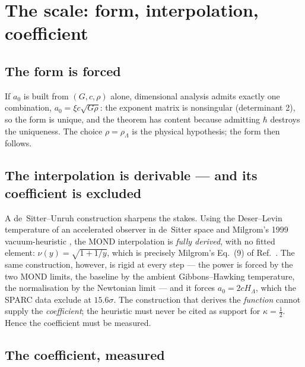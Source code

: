\documentclass[aps,prd,twocolumn,10pt,nofootinbib,superscriptaddress]{revtex4-2}
\begin{document}
\section{The scale: form, interpolation, coefficient}
\label{sec:coefficient}

\subsection{The form is forced}

If $a_0$ is built from $(G,c,\rho)$ alone, dimensional analysis admits exactly one combination,
$a_0=\xi c\sqrt{G\rho}$: the exponent matrix is nonsingular (determinant 2), so the form is unique,
and the theorem has content because admitting $\hbar$ destroys the uniqueness. The choice
$\rho=\rho_\Lambda$ is the physical hypothesis; the form then follows.

\subsection{The interpolation is derivable --- and its coefficient is excluded}

A de~Sitter--Unruh construction sharpens the stakes. Using the Deser--Levin temperature of an
accelerated observer in de~Sitter space \cite{DeserLevin} and Milgrom's 1999 vacuum-heuristic
\cite{Milgrom1999}, the MOND interpolation is \emph{fully derived}, with no fitted element:
$\nu(y)=\sqrt{1+1/y}$, which is precisely Milgrom's Eq.~(9) of Ref.~\cite{Milgrom1999}. The same
construction, however, is rigid at every step --- the power is forced by the two MOND limits, the
baseline by the ambient Gibbons--Hawking temperature, the normalisation by the Newtonian limit ---
and it forces $a_0=2cH_\Lambda$, which the SPARC data exclude at $15.6\sigma$. The construction that
derives the \emph{function} cannot supply the \emph{coefficient}; the heuristic must never be cited
as support for $\kappa=\tfrac12$. Hence the coefficient must be measured.

\subsection{The coefficient, measured}
\end{document}
